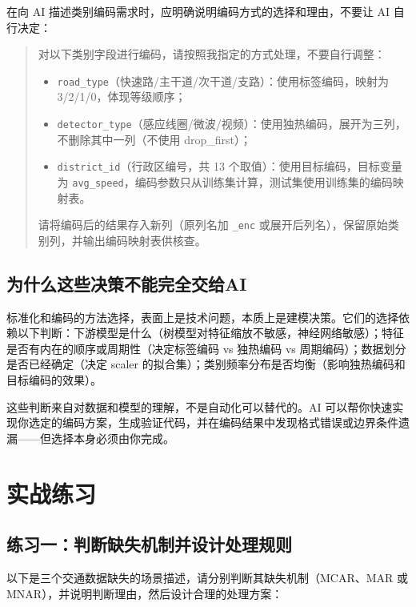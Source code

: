 在向 AI 描述类别编码需求时，应明确说明编码方式的选择和理由，不要让 AI 自行决定：

\begin{quote}
对以下类别字段进行编码，请按照我指定的方式处理，不要自行调整：

\begin{itemize}
  \item \texttt{road\_type}（快速路/主干道/次干道/支路）：使用标签编码，映射为 3/2/1/0，体现等级顺序；
  \item \texttt{detector\_type}（感应线圈/微波/视频）：使用独热编码，展开为三列，不删除其中一列（不使用 drop\_first）；
  \item \texttt{district\_id}（行政区编号，共 13 个取值）：使用目标编码，目标变量为 \texttt{avg\_speed}，编码参数只从训练集计算，测试集使用训练集的编码映射表。
\end{itemize}

请将编码后的结果存入新列（原列名加 \texttt{\_enc} 或展开后列名），保留原始类别列，并输出编码映射表供核查。
\end{quote}

\subsection{为什么这些决策不能完全交给AI}

标准化和编码的方法选择，表面上是技术问题，本质上是建模决策。它们的选择依赖以下判断：下游模型是什么（树模型对特征缩放不敏感，神经网络敏感）；特征是否有内在的顺序或周期性（决定标签编码 vs 独热编码 vs 周期编码）；数据划分是否已经确定（决定 scaler 的拟合集）；类别频率分布是否均衡（影响独热编码和目标编码的效果）。

这些判断来自对数据和模型的理解，不是自动化可以替代的。AI 可以帮你快速实现你选定的编码方案，生成验证代码，并在编码结果中发现格式错误或边界条件遗漏——但选择本身必须由你完成。

\section{实战练习}

\subsection*{练习一：判断缺失机制并设计处理规则}

以下是三个交通数据缺失的场景描述，请分别判断其缺失机制（MCAR、MAR 或 MNAR），并说明判断理由，然后设计合理的处理方案：

